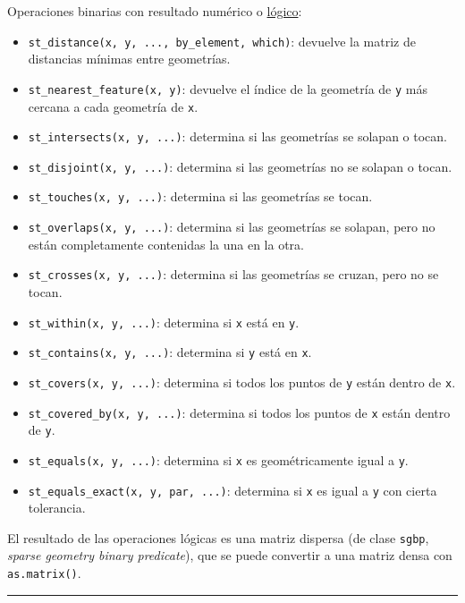 \documentclass[
]{book}
\providecommand{\tightlist}{%
  \setlength{\itemsep}{0pt}\setlength{\parskip}{0pt}}
\theoremstyle{break}
\theoremstyle{definition}
\theoremstyle{definition}
\theoremstyle{definition}
\theoremstyle{definition}
\theoremstyle{remark}
\begin{document}
Operaciones binarias con resultado numérico o \href{https://r-spatial.github.io/sf/reference/geos_binary_pred.html}{lógico}:

\begin{itemize}
\tightlist
\item
  \texttt{st\_distance(x,\ y,\ ...,\ by\_element,\ which)}: devuelve la matriz de distancias mínimas entre geometrías.
\item
  \texttt{st\_nearest\_feature(x,\ y)}: devuelve el índice de la geometría de \texttt{y} más cercana a cada geometría de \texttt{x}.
\item
  \texttt{st\_intersects(x,\ y,\ ...)}: determina si las geometrías se solapan o tocan.
\item
  \texttt{st\_disjoint(x,\ y,\ ...)}: determina si las geometrías no se solapan o tocan.
\item
  \texttt{st\_touches(x,\ y,\ ...)}: determina si las geometrías se tocan.
\item
  \texttt{st\_overlaps(x,\ y,\ ...)}: determina si las geometrías se solapan, pero no están completamente contenidas la una en la otra.
\item
  \texttt{st\_crosses(x,\ y,\ ...)}: determina si las geometrías se cruzan, pero no se tocan.
\item
  \texttt{st\_within(x,\ y,\ ...)}: determina si \texttt{x} está en \texttt{y}.
\item
  \texttt{st\_contains(x,\ y,\ ...)}: determina si \texttt{y} está en \texttt{x}.
\item
  \texttt{st\_covers(x,\ y,\ ...)}: determina si todos los puntos de \texttt{y} están dentro de \texttt{x}.
\item
  \texttt{st\_covered\_by(x,\ y,\ ...)}: determina si todos los puntos de \texttt{x} están dentro de \texttt{y}.
\item
  \texttt{st\_equals(x,\ y,\ ...)}: determina si \texttt{x} es geométricamente igual a \texttt{y}.
\item
  \texttt{st\_equals\_exact(x,\ y,\ par,\ ...)}: determina si \texttt{x} es igual a \texttt{y} con cierta tolerancia.
\end{itemize}

El resultado de las operaciones lógicas es una matriz dispersa (de clase \texttt{sgbp}, \emph{sparse geometry binary predicate}), que se puede convertir a una matriz densa con \texttt{as.matrix()}.

\begin{center}\rule{0.5\linewidth}{0.5pt}\end{center}
\end{document}

